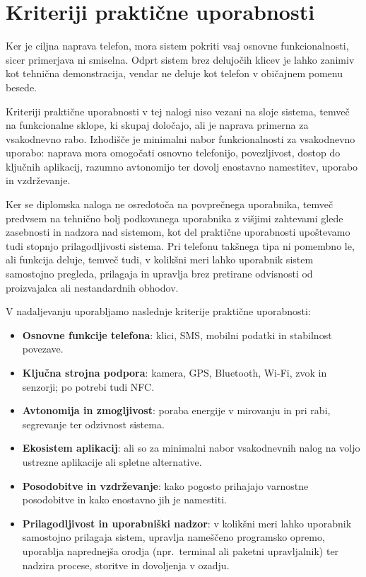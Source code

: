 \documentclass[a4paper,12pt,openright]{book}
\begin{document}
\section{Kriteriji praktične uporabnosti}
\label{sec:model_uporabnost}

Ker je ciljna naprava telefon, mora sistem pokriti vsaj osnovne funkcionalnosti, sicer primerjava ni smiselna.
Odprt sistem brez delujočih klicev je lahko zanimiv kot tehnična demonstracija, vendar ne deluje kot telefon v običajnem pomenu besede.

Kriteriji praktične uporabnosti v tej nalogi niso vezani na sloje sistema, temveč na funkcionalne sklope, ki skupaj določajo, ali je naprava primerna za vsakodnevno rabo.
Izhodišče je minimalni nabor funkcionalnosti za vsakodnevno uporabo: naprava mora omogočati osnovno telefonijo, povezljivost, dostop do ključnih aplikacij, razumno avtonomijo ter dovolj enostavno namestitev, uporabo in vzdrževanje.

Ker se diplomska naloga ne osredotoča na povprečnega uporabnika, temveč predvsem na tehnično bolj podkovanega uporabnika z višjimi zahtevami glede zasebnosti in nadzora nad sistemom, kot del praktične uporabnosti upoštevamo tudi stopnjo prilagodljivosti sistema.
Pri telefonu takšnega tipa ni pomembno le, ali funkcija deluje, temveč tudi, v kolikšni meri lahko uporabnik sistem samostojno pregleda, prilagaja in upravlja brez pretirane odvisnosti od proizvajalca ali nestandardnih obhodov.

V nadaljevanju uporabljamo naslednje kriterije praktične uporabnosti:

\begin{itemize}
  \item \textbf{Osnovne funkcije telefona}: klici, SMS, mobilni podatki in stabilnost povezave.
  \item \textbf{Ključna strojna podpora}: kamera, GPS, Bluetooth, Wi-Fi, zvok in senzorji; po potrebi tudi NFC.
  \item \textbf{Avtonomija in zmogljivost}: poraba energije v mirovanju in pri rabi, segrevanje ter odzivnost sistema.
  \item \textbf{Ekosistem aplikacij}: ali so za minimalni nabor vsakodnevnih nalog na voljo ustrezne aplikacije ali spletne alternative.
  \item \textbf{Posodobitve in vzdrževanje}: kako pogosto prihajajo varnostne posodobitve in kako enostavno jih je namestiti.
  \item \textbf{Prilagodljivost in uporabniški nadzor}: v kolikšni meri lahko uporabnik samostojno prilagaja sistem, upravlja nameščeno programsko opremo, uporablja naprednejša orodja (npr.~terminal ali paketni upravljalnik) ter nadzira procese, storitve in dovoljenja v ozadju.
\end{itemize}
\end{document}
